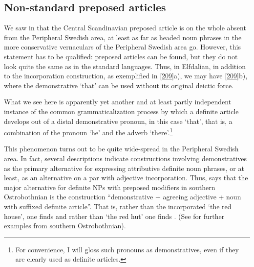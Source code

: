 \subsection{Non-standard preposed articles }
\label{bkm:Ref264372580}\label{bkm:Ref264372864}\label{bkm:Ref264372909}

We saw in  that the Central Scandinavian preposed article is on the whole absent from the Peripheral Swedish area, at least as far as headed noun phrases in the more conservative vernaculars of the Peripheral Swedish area go. However, this statement has to be qualified: preposed articles can be found, but they do not look quite the same as in the standard languages. Thus, in Elfdalian, in addition to the incorporation construction, as exemplified in \ref{209}a), we may have \ref{209}b), where the demonstrative  ‘that’ can be used without its original deictic force.

\ea\label{}

\z 
\z 

What we see here is apparently yet another and at least partly independent instance of the common grammaticalization process by which a definite article develops out of a distal demonstrative pronoun, in this case  ‘that’, that is, a combination of the pronoun  ‘he’ and the adverb  ‘there’.\footnote{ For convenience, I will gloss such pronouns as demonstratives, even if they are clearly used as definite articles.} 

This phenomenon turns out to be quite wide-spread in the Peripheral Swedish area. In fact, several descriptions indicate constructions involving demonstratives as the primary alternative for expressing attributive definite noun phrases, or at least, as an alternative on a par with adjective incorporation. Thus, \citet{Ivars2005} says that the major alternative for definite NPs with preposed modifiers in southern Ostrobothnian is the construction “demonstrative  + agreeing adjective + noun with suffixed definite article”. That is, rather than the incorporated  ‘the red house’, one finds  and rather than  ‘the red hut’ one finds . (See \citet[158]{Vangsnes2003} for further examples from southern Ostrobothnian). 

